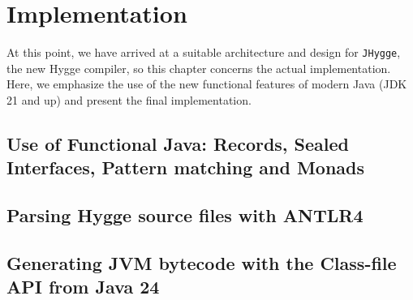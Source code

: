 \chapter{Implementation}

At this point, we have arrived at a suitable architecture and design for \texttt{JHygge}, the new Hygge compiler, so this chapter concerns the actual
implementation. Here, we emphasize the use of the new functional features of modern Java (JDK 21 and up) and present the final implementation. 

\section{Use of Functional Java: Records, Sealed Interfaces, Pattern matching and Monads}

\section{Parsing Hygge source files with ANTLR4}

\section{Generating JVM bytecode with the Class-file API from Java 24}
